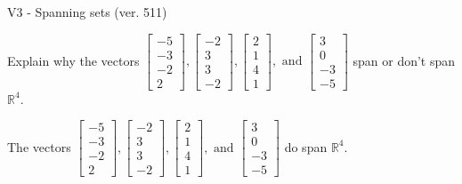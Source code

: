 \begin{exercise}
  \begin{exerciseTitle}V3 - Spanning sets (ver. 511)\end{exerciseTitle}
  \begin{exerciseStatement}
    Explain why the vectors \(\left[\begin{array}{r}
-5 \\
-3 \\
-2 \\
2
\end{array}\right] , \left[\begin{array}{r}
-2 \\
3 \\
3 \\
-2
\end{array}\right] , \left[\begin{array}{r}
2 \\
1 \\
4 \\
1
\end{array}\right] , \text{ and } \left[\begin{array}{r}
3 \\
0 \\
-3 \\
-5
\end{array}\right]\) span or don't span \(\mathbb{R}^4\). 
	


  \end{exerciseStatement}
  \begin{exerciseAnswer}
   The vectors \(\left[\begin{array}{r}
-5 \\
-3 \\
-2 \\
2
\end{array}\right] , \left[\begin{array}{r}
-2 \\
3 \\
3 \\
-2
\end{array}\right] , \left[\begin{array}{r}
2 \\
1 \\
4 \\
1
\end{array}\right] , \text{ and } \left[\begin{array}{r}
3 \\
0 \\
-3 \\
-5
\end{array}\right]\) 
  	 do  
	span \(\mathbb{R}^4\).
  


  \end{exerciseAnswer}
\end{exercise}